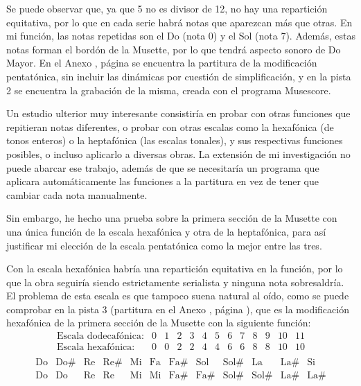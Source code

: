    	Se puede observar que, ya que 5 no es divisor de 12, no hay una repartición equitativa, por lo que en cada serie habrá notas que aparezcan más que otras. En mi función, las notas repetidas son el Do (nota 0) y el Sol (nota 7). Además, estas notas forman el bordón de la Musette, por lo que tendrá aspecto sonoro de Do Mayor. En el Anexo , página  se encuentra la partitura de la modificación pentatónica, sin incluir las dinámicas por cuestión de simplificación, y en la pista 2 se encuentra la grabación de la misma, creada con el programa Musescore.
   	
   	Un estudio ulterior muy interesante consistiría en probar con otras funciones que repitieran notas diferentes, o probar con otras escalas como la hexafónica (de tonos enteros) o la heptafónica (las escalas tonales), y sus respectivas funciones posibles, o incluso aplicarlo a diversas obras. La extensión de mi investigación no puede abarcar ese trabajo, además de que se necesitaría un programa que aplicara automáticamente las funciones a la partitura en vez de tener que cambiar cada nota manualmente.
   	
   	Sin embargo, he hecho una prueba sobre la primera sección de la Musette con una única función de la escala hexafónica y otra de la heptafónica, para así justificar mi elección de la escala pentatónica como la mejor entre las tres.
   	
   	Con la escala hexafónica habría una repartición equitativa en la función, por lo que la obra seguiría siendo estrictamente serialista y ninguna nota sobresaldría. El problema de esta escala es que tampoco suena natural al oído, como se puede comprobar en la pista 3 (partitura en el Anexo , página ), que es la modificación hexafónica de la primera sección de la Musette con la siguiente función:
   	\[\left.\begin{matrix}\text{Escala dodecafónica:}&0&1&2&3&4&5&6&7&8&9&10&11\\\text{Escala hexafónica:}&0&0&2&2&4&4&6&6&8&8&10&10\\\end{matrix}\right.\]
   	\[\left.\begin{matrix}\text{Do}&\text{Do\#}&\text{Re}&\text{Re\#}&\text{Mi}&\text{Fa}&\text{Fa\#}&\text{Sol}&\text{Sol\#}&\text{La}&\text{La\#}&\text{Si}\\\text{Do}&\text{Do}&\text{Re}&\text{Re}&\text{Mi}&\text{Mi}&\text{Fa\#}&\text{Fa\#}&\text{Sol\#}&\text{Sol\#}&\text{La\#}&\text{La\#}\\\end{matrix}\right.\]
   	
